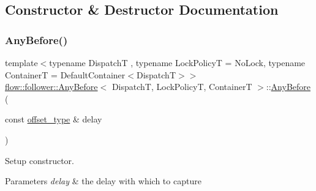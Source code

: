\subsection{Constructor \& Destructor Documentation}
\mbox{\label{classflow_1_1follower_1_1_any_before_a3ff5b82c3798a2754e8d803424138966}} 
\subsubsection{\texorpdfstring{Any\+Before()}{AnyBefore()}\hspace{0.1cm}{\footnotesize\ttfamily [1/2]}}
{\footnotesize\ttfamily template$<$typename DispatchT , typename Lock\+PolicyT  = No\+Lock, typename ContainerT  = Default\+Container$<$\+Dispatch\+T$>$$>$ \\
\hyperlink{classflow_1_1follower_1_1_any_before}{flow\+::follower\+::\+Any\+Before}$<$ DispatchT, Lock\+PolicyT, ContainerT $>$\+::\hyperlink{classflow_1_1follower_1_1_any_before}{Any\+Before} (\begin{DoxyParamCaption}\item[{const \hyperlink{classflow_1_1follower_1_1_any_before_a6ef017a648741bfd9ca4108556ac8edf}{offset\+\_\+type} \&}]{delay }\end{DoxyParamCaption})\hspace{0.3cm}{\ttfamily [explicit]}}



Setup constructor. 


\begin{DoxyParams}{Parameters}
{\em delay} & the delay with which to capture \\
\hline
\end{DoxyParams}
\mbox{\label{classflow_1_1follower_1_1_any_before_add93cb4a05f09cb34d4a5dc130e2ad6b}} 
